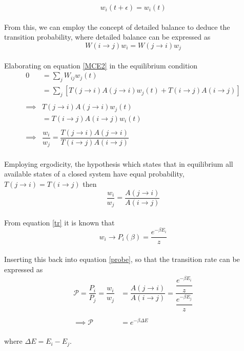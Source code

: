 \documentclass[%
reprint,nofootinbib,
amsmath,amssymb,
aps,
]{revtex4-1}
\begin{document}
\begin{equation}
	w_i(t+\epsilon) = w_i(t)
\end{equation}\\ 
From this, we can employ the concept of detailed balance to deduce the transition probability, where detailed balance can be expressed as \\
\begin{equation}
	W(i\rightarrow j)w_i = W(j \rightarrow i)w_j
\end{equation} \\
Elaborating on equation \ref{MCE2} in the equilibrium condition \\ 
\begin{align}\label{probe}
	0 &=  \sum_j W_{ij}w_j(t) \nonumber \\ &= \sum_j [T(j\rightarrow i)A(j\rightarrow i)w_j(t) + T(i\rightarrow j)A(i\rightarrow j)] \nonumber\\
	& \nonumber\\
	\implies & T(j\rightarrow i)A(j\rightarrow i)w_j(t)\nonumber \\  &= T(i\rightarrow j)A(i\rightarrow j)w_i(t)\nonumber \\ 
	& \nonumber\\
	\implies& \dfrac{w_i}{w_j} = \dfrac{T(j\rightarrow i)A(j\rightarrow i)}{T(i\rightarrow j)A(i\rightarrow j)}
\end{align} \\ 
Employing ergodicity, the hypothesis which states that in equilibrium all available
states of a closed system have equal probability, $T(j\rightarrow i) = T(i \rightarrow j)$ then \\
\begin{equation}
	\dfrac{w_i}{w_j} = \dfrac{A(j\rightarrow i)}{A(i\rightarrow j)}
\end{equation} \\ 
From equation \ref{tr} it is known that \\
\begin{equation}
	w_i \rightarrow P_i(\beta) = \dfrac{e^{-\beta E_i}}{z}
\end{equation} \\ 
Inserting this back into equation \ref{probe}, 
so that the transition rate can be expressed as \\
\begin{align} \label{probrate}
	\mathcal{P} =  \dfrac{P_i}{P_j} = \dfrac{w_i}{w_j} &  = \dfrac{A(j\rightarrow i)}{A(i\rightarrow j)}  = \dfrac{\dfrac{e^{-\beta E_i}}{z}}{\dfrac{e^{-\beta E_j}}{z}} \nonumber \\ & \nonumber \\ 
     \implies \mathcal{P} & =  e^{-\beta \Delta E}
\end{align} \\ 
where $\Delta E = E_i - E_j$.
\end{document}
